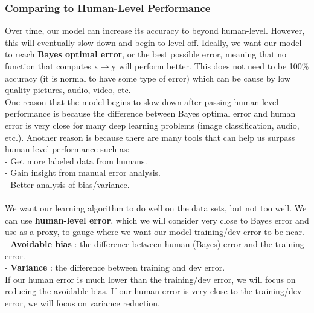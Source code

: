 \documentclass[11pt, a4paper]{article}
\begin{document}
\begin{spacing}{1.1}
	\subsubsection{Comparing to Human-Level Performance}
	Over time, our model can increase its accuracy to beyond human-level. However, this will eventually slow down and begin to level off. Ideally, we want our model to reach \textbf{Bayes optimal error}, or the best possible error, meaning that no function that computes x$\rightarrow$y will perform better. This does not need to be 100\% accuracy (it is normal to have some type of error) which can be cause by low quality pictures, audio, video, etc. \vspace*{1.5mm} \\
	One reason that the model begins to slow down after passing human-level performance is because the difference between Bayes optimal error and human error is very close for many deep learning problems (image classification, audio, etc.). Another reason is because there are many tools that can help us surpass human-level performance such as: \vspace*{.5mm} \\
	\hspace*{3mm} - Get more labeled data from humans. \\
	\hspace*{3mm} - Gain insight from manual error analysis. \\
	\hspace*{3mm} - Better analysis of bias/variance. \\~\\
	We want our learning algorithm to do well on the data sets, but not too well. We can use \textbf{human-level error}, which we will consider very close to Bayes error and use as a proxy, to gauge where we want our model training/dev error to be near. \vspace*{1mm} \\
	\hspace*{3mm} - \textbf{Avoidable bias} : the difference between human (Bayes) error and the training error. \\
	\hspace*{3mm} - \textbf{Variance} : the difference between training and dev error. \vspace*{1mm} \\
	If our human error is much lower than the training/dev error, we will focus on reducing the avoidable bias. If our human error is very close to the training/dev error, we will focus on variance reduction. \\~\\

\end{spacing}
\end{document}
